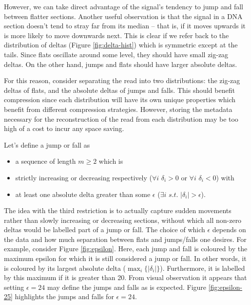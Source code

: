However, we can take direct advantage of the signal's tendency to jump and fall
between flatter sections. Another useful observation is that the signal in a DNA
section doesn't tend to stray far from its median -- that is, if it moves
upwards it is more likely to move downwards next. This is clear if we refer back
to the distribution of deltas (Figure \ref{fig:delta-hist}) which is symmetric
except at the tails. Since flats oscillate around some level, they should have
small zig-zag deltas. On the other hand, jumps and flats should have larger
absolute deltas.

For this reason, consider separating the read into two distributions: the
zig-zag deltas of flats, and the absolute deltas of jumps and falls. This should
benefit compression since each distribution will have its own unique properties
which benefit from different compression strategies. However, storing the
metadata necessary for the reconstruction of the read from each distribution may
be too high of a cost to incur any space saving.

Let's define a jump or fall as
\begin{itemize}
	\item a sequence of length $m\ge 2$ which is
	\item strictly increasing or decreasing respectively ($\forall i$ $\delta_i>0$ or $\forall i$ $\delta_i < 0$) with
	\item at least one absolute delta greater than some $\epsilon$ ($\exists i$ $s.t.$ $|\delta_i|>\epsilon$).
\end{itemize}

The idea with the third restriction is to actually capture sudden movements
rather than slowly increasing or decreasing sections, without which all non-zero
deltas would be labelled part of a jump or fall. The choice of which $\epsilon$
depends on the data and how much separation between flats and jumps/falls one
desires. For example, consider Figure \ref{fig:epsilon}. Here, each jump and fall
is coloured by the maximum epsilon for which it is still considered a jump or
fall. In other words, it is coloured by its largest absolute delta
($\max_i\{|\delta_i|\}$). Furthermore, it is labelled by this maximum if it is
greater than 20. From visual observation it appears that setting $\epsilon=24$
may define the jumps and falls as is expected. Figure \ref{fig:epsilon-25}
highlights the jumps and falls for $\epsilon=24$.




